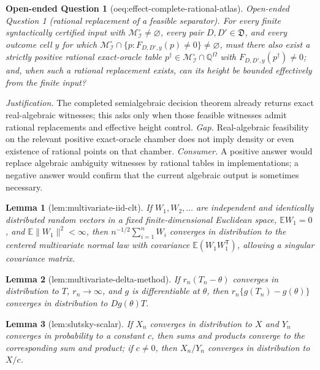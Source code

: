 \documentclass{article}
\newtheorem{lemma}{Lemma}
\newtheorem{openendedquestion}{Open-ended Question}
\begin{document}
\begin{openendedquestion}[oeq:effect-complete-rational-atlas]\label{oeq:effect-complete-rational-atlas}
Open-ended Question 1 (rational replacement of a feasible separator). For every finite syntactically certified input with \(\mathcal M_{\mathcal I}^{\circ}\neq\varnothing\), every pair \(D,D'\in\mathfrak D\), and every outcome cell \(y\) for which \(\mathcal M_{\mathcal I}^{\circ}\cap\{p:F_{D,D',y}(p)\neq0\}\neq\varnothing\), must there also exist a strictly positive rational exact-oracle table \(p^\dagger\in\mathcal M_{\mathcal I}^{\circ}\cap\mathbb Q^{\Omega}\) with \(F_{D,D',y}(p^\dagger)\neq0\); and, when such a rational replacement exists, can its height be bounded effectively from the finite input?
\end{openendedquestion}
\par\smallskip\noindent \textit{Justification.} The completed semialgebraic decision theorem already returns exact real-algebraic witnesses; this asks only when those feasible witnesses admit rational replacements and effective height control. \textit{Gap.} Real-algebraic feasibility on the relevant positive exact-oracle chamber does not imply density or even existence of rational points on that chamber. \textit{Consumer.} A positive answer would replace algebraic ambiguity witnesses by rational tables in implementations; a negative answer would confirm that the current algebraic output is sometimes necessary.

\begin{lemma}[lem:multivariate-iid-clt]\label{lem:multivariate-iid-clt}
If \(W_1,W_2,\ldots\) are independent and identically distributed random vectors in a fixed finite-dimensional Euclidean space, \(\mathbb E W_1=0\), and \(\mathbb E\|W_1\|^2<\infty\), then \(n^{-1/2}\sum_{i=1}^nW_i\) converges in distribution to the centered multivariate normal law with covariance \(\mathbb E(W_1W_1^{\mathsf T})\), allowing a singular covariance matrix.
\end{lemma}

\begin{lemma}[lem:multivariate-delta-method]\label{lem:multivariate-delta-method}
If \(r_n(T_n-\theta)\) converges in distribution to \(T\), \(r_n\to\infty\), and \(g\) is differentiable at \(\theta\), then \(r_n\{g(T_n)-g(\theta)\}\) converges in distribution to \(Dg(\theta)T\).
\end{lemma}

\begin{lemma}[lem:slutsky-scalar]\label{lem:slutsky-scalar}
If \(X_n\) converges in distribution to \(X\) and \(Y_n\) converges in probability to a constant \(c\), then sums and products converge to the corresponding sum and product; if \(c\neq0\), then \(X_n/Y_n\) converges in distribution to \(X/c\).
\end{lemma}
\end{document}
